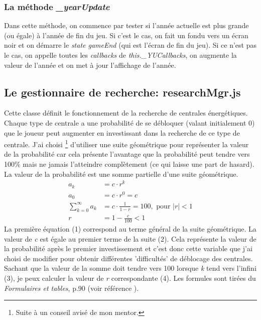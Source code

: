 \documentclass{article}
\begin{document}
		\subsubsection{La méthode \textit{\_yearUpdate}}
		Dans cette méthode,  on commence par tester si l'année actuelle est plus grande (ou égale) à l'année de fin du jeu. Si c'est le cas, on fait un fondu vers un écran noir et on démarre le \textit{state gameEnd} (qui est l'écran de fin du jeu).
		Si ce n'est pas le cas, on appelle toutes les \textit{callbacks} de \textit{this.\_YUCallbacks}, on augmente la valeur de l'année et on met à jour l'affichage de l'année.
		
		\subsection{Le gestionnaire de recherche: researchMgr.js} \label{researchMgr}
		
		
		Cette classe définit le fonctionnement de la recherche de centrales énergétiques.
		Chaque type de centrale a une probabilité de se débloquer (valant initialement 0) que le joueur peut augmenter en investissant dans la recherche de ce type de centrale. J'ai choisi \footnote{Suite à un conseil avisé de mon mentor.} d'utiliser une suite géométrique pour représenter la valeur de la probabilité car cela présente l'avantage que la probabilité peut tendre vers 100\% mais ne jamais l'atteindre complètement (ce qui laisse une part de hasard).
		La valeur de la probabilité est une somme partielle d'une suite géométrique.
		\begin{align}
  				a_{k} &= c\cdot r^{k}\\
    			a_{0} &= c\cdot r^{0} = c\\
    			\sum_{k=0}^{\infty} a_{k} &= c\cdot \frac{1}{1-r} = 100,\text{ pour } |r|<1 \\
    			r &= 1 - \frac{c}{100} < 1
		\end{align}
		La première équation (1) correspond au terme général de la suite géométrique.
		La valeur de \textit{c} est égale au premier terme de la suite (2). Cela représente la valeur de la probabilité après le premier investissement et c'est donc cette variable que j'ai choisi de modifier pour obtenir différentes 'difficultés' de déblocage des centrales. Sachant que la valeur de la somme doit tendre vers 100 lorsque \textit{k} tend vers l'infini (3), je peux calculer la valeur de \textit{r} correspondante (4). Les formules sont tirées du \textit{Formulaires et tables}, p.90 (voir référence \cite{FetT}).
		
\end{document}
